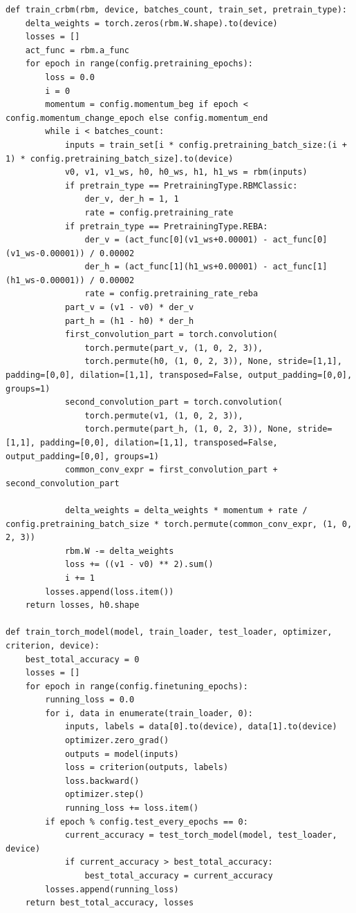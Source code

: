 \begin{lstlisting}[style=PythonStyle]
def train_crbm(rbm, device, batches_count, train_set, pretrain_type):
    delta_weights = torch.zeros(rbm.W.shape).to(device)
    losses = []
    act_func = rbm.a_func
    for epoch in range(config.pretraining_epochs):
        loss = 0.0
        i = 0
        momentum = config.momentum_beg if epoch < config.momentum_change_epoch else config.momentum_end
        while i < batches_count:
            inputs = train_set[i * config.pretraining_batch_size:(i + 1) * config.pretraining_batch_size].to(device)
            v0, v1, v1_ws, h0, h0_ws, h1, h1_ws = rbm(inputs)
            if pretrain_type == PretrainingType.RBMClassic:
                der_v, der_h = 1, 1
                rate = config.pretraining_rate
            if pretrain_type == PretrainingType.REBA:
                der_v = (act_func[0](v1_ws+0.00001) - act_func[0](v1_ws-0.00001)) / 0.00002
                der_h = (act_func[1](h1_ws+0.00001) - act_func[1](h1_ws-0.00001)) / 0.00002
                rate = config.pretraining_rate_reba
            part_v = (v1 - v0) * der_v
            part_h = (h1 - h0) * der_h
            first_convolution_part = torch.convolution(
                torch.permute(part_v, (1, 0, 2, 3)),
                torch.permute(h0, (1, 0, 2, 3)), None, stride=[1,1], padding=[0,0], dilation=[1,1], transposed=False, output_padding=[0,0], groups=1)
            second_convolution_part = torch.convolution(
                torch.permute(v1, (1, 0, 2, 3)),
                torch.permute(part_h, (1, 0, 2, 3)), None, stride=[1,1], padding=[0,0], dilation=[1,1], transposed=False, output_padding=[0,0], groups=1)
            common_conv_expr = first_convolution_part + second_convolution_part

            delta_weights = delta_weights * momentum + rate / config.pretraining_batch_size * torch.permute(common_conv_expr, (1, 0, 2, 3))
            rbm.W -= delta_weights
            loss += ((v1 - v0) ** 2).sum()
            i += 1
        losses.append(loss.item())
    return losses, h0.shape

def train_torch_model(model, train_loader, test_loader, optimizer, criterion, device):
    best_total_accuracy = 0
    losses = []
    for epoch in range(config.finetuning_epochs):
        running_loss = 0.0
        for i, data in enumerate(train_loader, 0):
            inputs, labels = data[0].to(device), data[1].to(device)
            optimizer.zero_grad()
            outputs = model(inputs)
            loss = criterion(outputs, labels)
            loss.backward()
            optimizer.step()
            running_loss += loss.item()
        if epoch % config.test_every_epochs == 0:
            current_accuracy = test_torch_model(model, test_loader, device)
            if current_accuracy > best_total_accuracy:
                best_total_accuracy = current_accuracy
        losses.append(running_loss)
    return best_total_accuracy, losses


\end{lstlisting}
